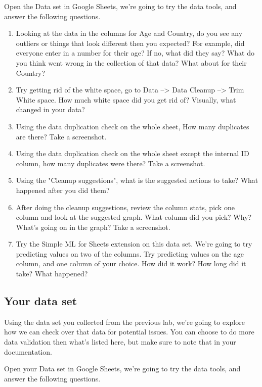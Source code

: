 \documentclass[12pt]{article}
\begin{document}
Open the Data set in Google Sheets, we're going to try the data tools, and answer the following questions. 
\begin{enumerate}
    \item Looking at the data in the columns for Age and Country, do you see any outliers or things that look different then you expected? For example, did everyone enter in a number for their age? If no, what did they say? What do you think went wrong in the collection of that data?  What about for their Country?
    \item Try getting rid of the white space, go to Data --> Data Cleanup --> Trim White space.  How much white space did you get rid of? Visually, what changed in your data?
    \item Using the data duplication check on the whole sheet, How many duplicates are there? Take a screenshot.
    \item Using the data duplication check on the whole sheet except the internal ID column, how many duplicates were there? Take a screenshot.
    \item Using the "Cleanup suggestions", what is the suggested actions to take? What happened after you did them? 
    \item After doing the cleanup suggestions, review the column stats, pick one column and look at the suggested graph.  What column did you pick? Why? What's going on in the graph? Take a screenshot.
    \item Try the Simple ML for Sheets extension on this data set. We're going to try predicting values on two of the columns.  Try predicting values on the age column, and one column of your choice.  How did it work? How long did it take? What happened?
\end{enumerate}

 
\subsection*{Your data set}
Using the data set you collected from the previous lab, we're going to explore how we can check over that data for potential issues.  You can choose to do more data validation then what's listed here, but make sure to note that in your documentation.

Open your Data set in Google Sheets, we're going to try the data tools, and answer the following questions. 
\end{document}
